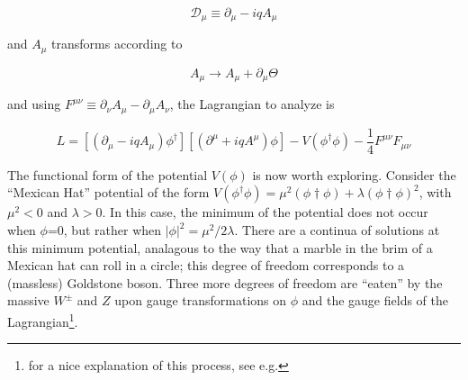 \begin{equation}
\mathscr{D}_\mu \equiv \partial_\mu - iqA_\mu
\end{equation}

and $A_{\mu}$ transforms according to 

\begin{equation}
A_\mu \rightarrow A_\mu + \partial_\mu\Theta
\end{equation}

and using $F^{\mu\nu}\equiv \partial_\nu A_\mu - \partial_\mu A_\nu$, the Lagrangian
to analyze is 

\begin{equation}
L = [(\partial_\mu - iqA_\mu)\phi^{\dagger}][(\partial^\mu + iqA^\mu)\phi] - V(\phi^{\dagger}\phi) - \frac{1}{4}F^{\mu\nu}F_{\mu\nu}
\end{equation}




The functional form of the potential $V(\phi)$ is now worth exploring.
Consider the ``Mexican Hat'' potential of the form $V(\phi^{\dagger}\phi)=\mu^2(\phi\dagger\phi)+\lambda(\phi\dagger\phi)^2$, with $\mu^2<$0 and $\lambda>$0. In this case, the minimum of the potential
does not occur when $\phi$=0, but rather when $|\phi|^2=\mu^2/2\lambda$.
There are a continua of solutions at this minimum potential, analagous to 
the way that a marble in the brim of a Mexican hat can roll in a circle;
this degree of freedom corresponds to a (massless) Goldstone boson.
Three more degrees of freedom
are ``eaten'' by the massive $W^\pm$ and $Z$ upon gauge transformations on $\phi$ 
and the gauge fields of the Lagrangian\footnote{for a nice explanation of this
process, see e.g.\cite{ellis}}.

